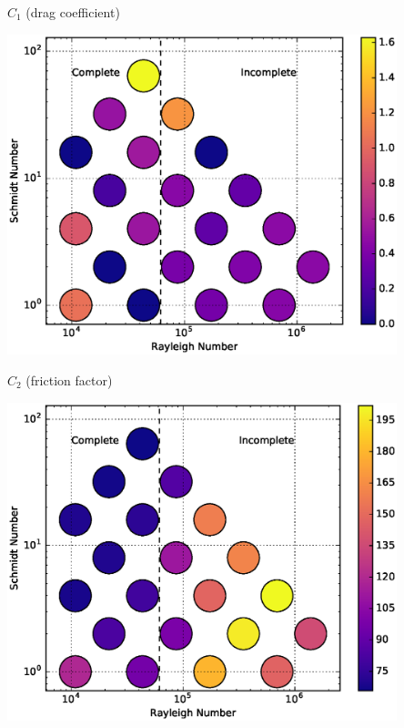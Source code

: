 \documentclass[12pt]{beamer}
\begin{document}
\begin{frame}[t]{$C_1$ (drag coefficient)}
\begin{center}
\vspace{-11pt}
\includegraphics[width=0.85\textwidth]{graphics/C1-vs-Rayleigh-Schmidt.eps}
\end{center}
\end{frame}

\begin{frame}[t]{$C_2$ (friction factor)}
\begin{center}
\vspace{-11pt}
\includegraphics[width=0.85\textwidth]{graphics/C2-vs-Rayleigh-Schmidt.eps}
\end{center}
\end{frame}
\end{document}

